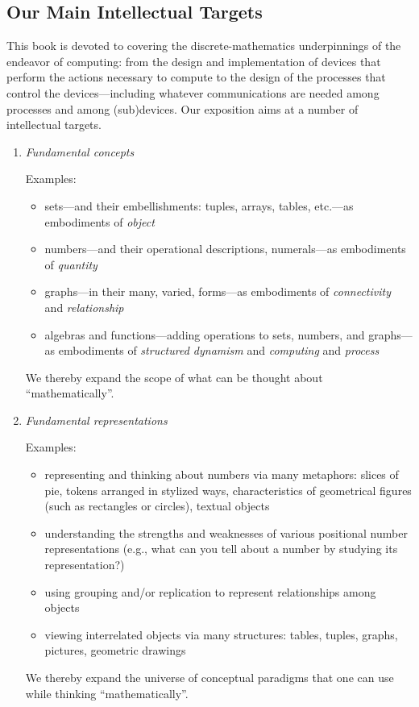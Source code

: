 \subsection{Our Main Intellectual Targets}
\label{sec:book-overwiew}

This book is devoted to covering the discrete-mathematics underpinnings of the endeavor of computing: from the design and implementation of devices that perform the actions necessary to
compute to the design of the processes that control the devices---including whatever communications are needed among processes and among (sub)devices.  Our exposition aims at a number of intellectual targets.
\begin{enumerate}
\item
{\it Fundamental concepts}

\medskip

{\small\sf Examples:}
\begin{itemize}
\item
sets---and their embellishments: tuples, arrays, tables, etc.---as embodiments of {\it object}
\medskip\item
numbers---and their operational descriptions, numerals---as embodiments of {\it quantity}
\medskip\item
graphs---in their many, varied, forms---as embodiments of {\it connectivity} and {\it relationship}
\medskip\item
algebras and functions---adding operations to sets, numbers, and graphs---as embodiments of {\it structured dynamism} and {\it computing} and {\it process}
\end{itemize}
We thereby expand the scope of what can be thought about ``mathematically''.

\medskip\item
{\it Fundamental representations}

\medskip

{\small\sf Examples:}
\begin{itemize}
\item
representing and thinking about numbers via many metaphors: slices of pie, tokens arranged in stylized ways, characteristics of geometrical figures (such as rectangles or circles), textual objects
\medskip\item
understanding the strengths and weaknesses of various positional number representations (e.g., what can you tell about a number by studying its representation?)
\medskip\item
using grouping and/or replication to represent relationships among objects
\medskip\item
viewing interrelated objects via many structures: tables, tuples, graphs, pictures, geometric drawings
\end{itemize}
We thereby expand the universe of conceptual paradigms that one can use while thinking ``mathematically''.


\end{enumerate}
